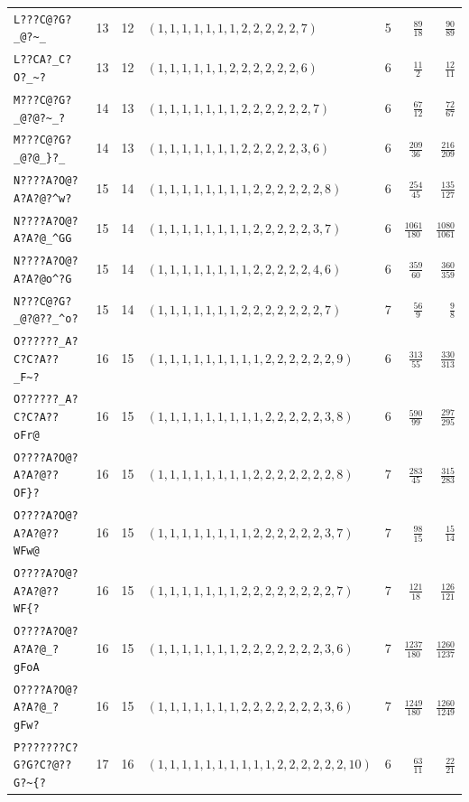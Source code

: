 \documentclass[paper=a4,fontsize=10.5pt,jafontsize=10.5pt]{jlreq}
\theoremstyle{plain}
\theoremstyle{definition}
\begin{document}
\begin{table}[htbp]
\begin{tabular}{llrlrrr}
\texttt{L???C@?G?\_@?\textasciitilde{}\_} & 13 & 12 & $(1,1,1,1,1,1,1,2,2,2,2,2,7)$ & 5 & $\frac{89}{18}$ & $\frac{90}{89}$ \\
\texttt{L??CA?\_C?O?\_\textasciitilde{}?} & 13 & 12 & $(1,1,1,1,1,1,2,2,2,2,2,2,6)$ & 6 & $\frac{11}{2}$ & $\frac{12}{11}$ \\
\texttt{M???C@?G?\_@?@?\textasciitilde{}\_?} & 14 & 13 & $(1,1,1,1,1,1,1,2,2,2,2,2,2,7)$ & 6 & $\frac{67}{12}$ & $\frac{72}{67}$ \\
\texttt{M???C@?G?\_@?@\_\}?\_} & 14 & 13 & $(1,1,1,1,1,1,1,2,2,2,2,2,3,6)$ & 6 & $\frac{209}{36}$ & $\frac{216}{209}$ \\
\texttt{N????A?O@?A?A?@?\textasciicircum{}w?} & 15 & 14 & $(1,1,1,1,1,1,1,1,2,2,2,2,2,2,8)$ & 6 & $\frac{254}{45}$ & $\frac{135}{127}$ \\
\texttt{N????A?O@?A?A?@\_\textasciicircum{}GG} & 15 & 14 & $(1,1,1,1,1,1,1,1,2,2,2,2,2,3,7)$ & 6 & $\frac{1061}{180}$ & $\frac{1080}{1061}$ \\
\texttt{N????A?O@?A?A?@o\textasciicircum{}?G} & 15 & 14 & $(1,1,1,1,1,1,1,1,2,2,2,2,2,4,6)$ & 6 & $\frac{359}{60}$ & $\frac{360}{359}$ \\
\texttt{N???C@?G?\_@?@??\_\textasciicircum{}o?} & 15 & 14 & $(1,1,1,1,1,1,1,2,2,2,2,2,2,2,7)$ & 7 & $\frac{56}{9}$ & $\frac{9}{8}$ \\
\texttt{O??????\_A?C?C?A??\_F\textasciitilde{}?} & 16 & 15 & $(1,1,1,1,1,1,1,1,1,2,2,2,2,2,2,9)$ & 6 & $\frac{313}{55}$ & $\frac{330}{313}$ \\
\texttt{O??????\_A?C?C?A??oFr@} & 16 & 15 & $(1,1,1,1,1,1,1,1,1,2,2,2,2,2,3,8)$ & 6 & $\frac{590}{99}$ & $\frac{297}{295}$ \\
\texttt{O????A?O@?A?A?@??OF\}?} & 16 & 15 & $(1,1,1,1,1,1,1,1,2,2,2,2,2,2,2,8)$ & 7 & $\frac{283}{45}$ & $\frac{315}{283}$ \\
\texttt{O????A?O@?A?A?@??WFw@} & 16 & 15 & $(1,1,1,1,1,1,1,1,2,2,2,2,2,2,3,7)$ & 7 & $\frac{98}{15}$ & $\frac{15}{14}$ \\
\texttt{O????A?O@?A?A?@??WF\{?} & 16 & 15 & $(1,1,1,1,1,1,1,2,2,2,2,2,2,2,2,7)$ & 7 & $\frac{121}{18}$ & $\frac{126}{121}$ \\
\texttt{O????A?O@?A?A?@\_?gFoA} & 16 & 15 & $(1,1,1,1,1,1,1,2,2,2,2,2,2,2,3,6)$ & 7 & $\frac{1237}{180}$ & $\frac{1260}{1237}$ \\
\texttt{O????A?O@?A?A?@\_?gFw?} & 16 & 15 & $(1,1,1,1,1,1,1,2,2,2,2,2,2,2,3,6)$ & 7 & $\frac{1249}{180}$ & $\frac{1260}{1249}$ \\
\texttt{P???????C?G?G?C?@??G?\textasciitilde{}\{?} & 17 & 16 & $(1,1,1,1,1,1,1,1,1,1,2,2,2,2,2,2,10)$ & 6 & $\frac{63}{11}$ & $\frac{22}{21}$ \\

\end{tabular}
\end{table}
\end{document}
